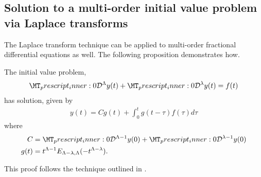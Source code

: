\subsection{Solution to a multi-order initial value problem via Laplace transforms}
The Laplace transform technique can be applied to multi-order fractional differential equations as well. The following proposition demonstrates how.
\begin{mdframed}[innertopmargin=10pt]
\begin{lemma}
	The initial value problem,
	\begin{align}
	    \label{eq:fde-multi-order}
	    \prescript{}{0}{\mathcal{D}}^{\Lambda}y(t) + \prescript{}{0}{\mathcal{D}}^{\lambda}y(t) = f(t)
	\end{align}
	has solution, given by
	\begin{align*}
		y(t) = C g(t) + \int_0^t g(t-\tau)f(\tau) d\tau
	\end{align*}
where
	\begin{align*}
		C &= \prescript{}{0}{\mathcal{D}}^{\Lambda-1}y(0) + \prescript{}{0}{\mathcal{D}}^{\lambda-1}y(0) \\
		g(t) &= t^{\Lambda - 1} E_{\Lambda - \lambda, \Lambda}(-t^{\Lambda - \lambda}).
	\end{align*}
\end{lemma}
\end{mdframed}
This proof follows the technique outlined in \cite{Podlubny1999}.

